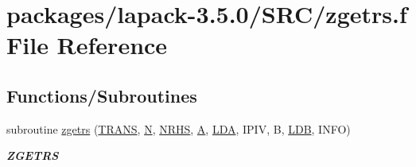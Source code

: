 \hypertarget{zgetrs_8f}{}\section{packages/lapack-\/3.5.0/\+S\+R\+C/zgetrs.f File Reference}
\label{zgetrs_8f}
\subsection*{Functions/\+Subroutines}
\begin{DoxyCompactItemize}
\item 
subroutine \hyperlink{group__complex16GEcomputational_ga3a5b88a7e8bf70591e521e86464e109d}{zgetrs} (\hyperlink{superlu__enum__consts_8h_a0c4e17b2d5cea33f9991ccc6a6678d62a1f61e3015bfe0f0c2c3fda4c5a0cdf58}{T\+R\+A\+N\+S}, \hyperlink{polmisc_8c_a0240ac851181b84ac374872dc5434ee4}{N}, \hyperlink{example__user_8c_aa0138da002ce2a90360df2f521eb3198}{N\+R\+H\+S}, \hyperlink{classA}{A}, \hyperlink{example__user_8c_ae946da542ce0db94dced19b2ecefd1aa}{L\+D\+A}, I\+P\+I\+V, B, \hyperlink{example__user_8c_a50e90a7104df172b5a89a06c47fcca04}{L\+D\+B}, I\+N\+F\+O)
\begin{DoxyCompactList}\small\item\em {\bfseries Z\+G\+E\+T\+R\+S} \end{DoxyCompactList}\end{DoxyCompactItemize}
